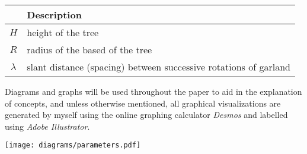 \noindent
\begin{minipage}{0.65\textwidth}
    \setlength{\parindent}{17pt}
    \begin{table}[H]
        \centering
        \singlespacing
        \begin{tabularx}{0.9\textwidth}{>{\hsize=0.4\hsize}c>{\hsize=0.6\hsize}X}
            \toprule
            {\bfseries Parameter} & {\bfseries Description}                                          \\
            \midrule
            $H$                   & height of the tree                                               \\
            $R$                   & radius of the based of the tree                                  \\
            $\lambda$             & slant distance (spacing) between successive rotations of garland \\
            \bottomrule
        \end{tabularx}
    \end{table}

    Diagrams and graphs will be used throughout the paper to aid in the explanation of concepts, and unless otherwise mentioned, all graphical visualizations are generated by myself using the online graphing calculator \emph{Desmos} and labelled using \emph{Adobe Illustrator}.
\end{minipage}
\begin{minipage}{0.35\textwidth}
    \centering
    \texttt{[image: diagrams/parameters.pdf]}
     \label{fig:params}
\end{minipage}


